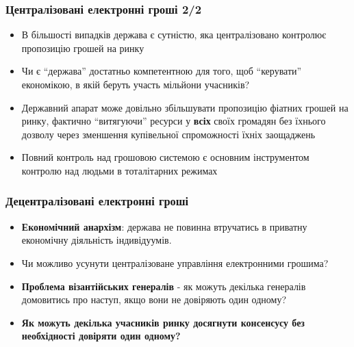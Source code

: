 \documentclass{beamer}
\begin{document}
\begin{frame}
  \frametitle{Централізовані електронні гроші 2/2}
  \begin{itemize}
  \item В більшості випадків держава є сутністю, яка централізовано контролює
    пропозицію грошей на ринку
  \item Чи є ``держава'' достатньо компетентною для того, щоб ``керувати''
    економікою, в якій беруть участь мільйони учасників?
  \item Державний апарат може довільно збільшувати пропозицію фіатних грошей на
    ринку, фактично ``витягуючи'' ресурси у \textbf{всіх} своїх громадян без
    їхнього дозволу через зменшення купівельної спроможності їхніх заощаджень
  \item Повний контроль над грошовою системою є основним інструментом контролю
    над людьми в тоталітарних режимах
  \end{itemize}
\end{frame}

\begin{frame}
  \frametitle{Децентралізовані електронні гроші}
  \begin{itemize}
  \item \textbf{Економічний анархізм}: держава не повинна втручатись в приватну
    економічну діяльність індивідуумів.
  \item Чи можливо усунути централізоване управління електронними грошима?
  \item \textbf{Проблема візантійських генералів} - як можуть декілька генералів
    домовитись про наступ, якщо вони не довіряють один одному?
  \item \textbf{Як можуть декілька учасників ринку досягнути консенсусу без
      необхідності довіряти один одному?}
  \end{itemize}
\end{frame}
\end{document}
